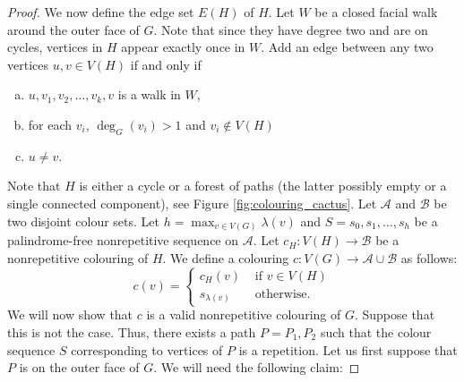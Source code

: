 \documentclass{patmorin}
\begin{document}
\begin{proof}
 
 We now define the edge set $E(H)$ of $H$. Let $W$ be a closed facial walk around the outer face of $G$. Note that since they have degree two and are on cycles, vertices in $H$ appear exactly once in $W$. Add an edge between any two vertices $u,v \in V(H)$ if and only if 
 \begin{enumerate}[a)]
  \item $u,v_1,v_2,\ldots,v_k,v$ is a walk in $W$,
  \item for each $v_i$, $\deg_G(v_i) > 1$ and $v_i \notin V(H)$
  \item $u\not=v$.
 \end{enumerate}
 Note that $H$ is either a cycle or a forest of paths (the latter possibly empty or a single connected component), see Figure \ref{fig:colouring_cactus}. Let $\mathcal{A}$ and $\mathcal{B}$ be two disjoint colour sets. Let $h=\max_{v \in V(G)} \lambda(v)$ and $S=s_0,s_1,\ldots,s_h$ be a palindrome-free nonrepetitive sequence on $\mathcal{A}$. Let $c_H : V(H) \rightarrow \mathcal{B}$ be a nonrepetitive colouring of $H$. We define a colouring $c : V(G) \rightarrow \mathcal{A} \cup \mathcal{B}$ as follows:
 \begin{equation}
  c(v) = \begin{cases}
          c_H(v) & \text{ if } v \in V(H)\\
          s_{\lambda(v)} & \text{ otherwise.}
         \end{cases}
 \end{equation}
 We will now show that $c$ is a valid nonrepetitive colouring of $G$. Suppose that this is not the case. Thus, there exists a path $P=P_1,P_2$ such that the colour sequence $S$ corresponding to vertices of $P$ is a repetition. Let us first suppose that $P$ is on the outer face of $G$. We will need the following claim:
 

\end{proof}
\end{document}
